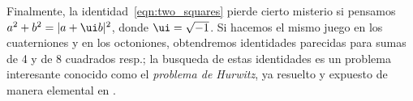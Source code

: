\documentclass[11pt, reqno]{amsart}
\begin{document}
Finalmente, la identidad~\eqref{eqn:two_squares} pierde cierto misterio si pensamos $a^2 + b^2 = |a + \ui b|^2$, donde $\ui = \sqrt{-1}$.
Si hacemos el mismo juego en los cuaterniones y en los octoniones, obtendremos identidades parecidas para sumas de 4 y de 8 cuadrados resp.;
la busqueda de estas identidades es un problema interesante conocido como el \textit{problema de Hurwitz}, ya resuelto y expuesto de manera elemental
en \cite{rajwade:squares}.

\nocite{cassels:local_fields, conrad:local_global, rajwade:squares}
\printbibliography[title={Referencias y lecturas adicionales}]
\end{document}
